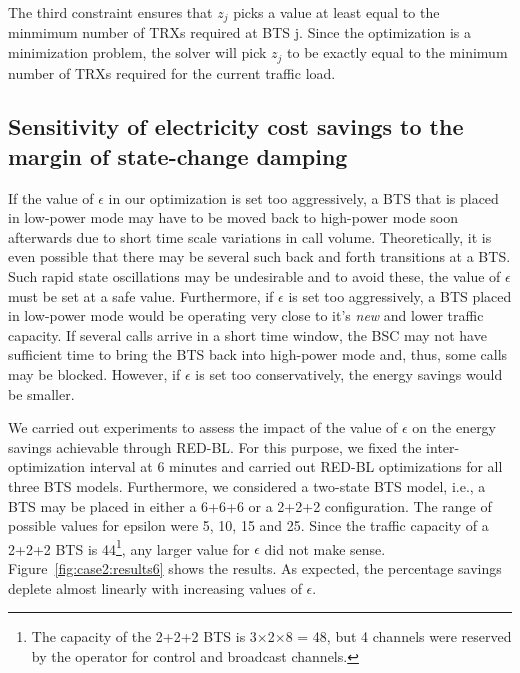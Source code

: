 The third constraint ensures that $z_j$ picks a value at least equal to the minmimum number of TRXs required at BTS j. Since the optimization is a minimization problem, the solver will pick $z_j$ to be exactly equal to the minimum number of TRXs required for the current traffic load.



\subsection{Sensitivity of electricity cost savings to the margin of state-change damping} %
\label{subsec:case2:results:epsilon} If the value of $\epsilon$ in our optimization is set too aggressively, a BTS that is placed in low-power mode may have to be moved back to high-power mode soon afterwards due to short time scale variations in call volume. Theoretically, it is even possible that there may be several such back and forth transitions at a BTS. Such rapid state oscillations may be undesirable and to avoid these, the value of $\epsilon$ must be set at a safe value. Furthermore, if $\epsilon$ is set too aggressively, a BTS placed in low-power mode would be operating very close to it's \textit{new} and lower traffic capacity. If several calls arrive in a short time window, the BSC may not have sufficient time to bring the BTS back into high-power mode and, thus, some calls may be blocked. However, if $\epsilon$ is set too conservatively, the energy savings would be smaller. 

We carried out experiments to assess the impact of the value of $\epsilon$ on the energy savings achievable through RED-BL. For this purpose, we fixed the inter-optimization interval at 6 minutes and carried out RED-BL optimizations for all three BTS models. Furthermore, we considered a two-state BTS model, i.e., a BTS may be placed in either a 6+6+6 or a 2+2+2 configuration. The range of possible values for epsilon were 5, 10, 15 and 25. Since the traffic capacity of a 2+2+2 BTS is 44\footnote{The capacity of the 2+2+2 BTS is 3$\times$2$\times$8 = 48, but 4 channels were reserved by the operator for control and broadcast channels.}, any larger value for $\epsilon$ did not make sense. Figure~\ref{fig:case2:results6} shows the results. As expected, the percentage savings deplete almost linearly with increasing values of $\epsilon$.

